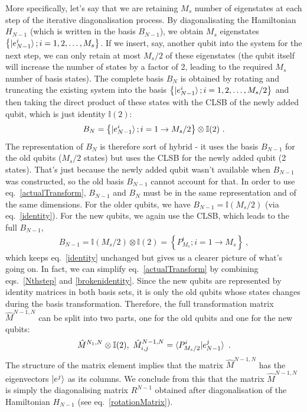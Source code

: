 \documentclass[reprint]{revtex4-2}
\begin{document}
More specifically, let's say that we are retaining \(M_s\) number of eigenstates at each step of the iterative diagonalisation process. By diagonalisating the Hamiltonian \(H_{N-1}\) (which is written in the basis \(B_{N-1}\)), we obtain \(M_s\) eigenstates \( \left\{ \ket{e^i_{N-1}}; i=1,2,\ldots,M_s\right\} \). If we insert, say, another qubit into the system for the next step, we can only retain at most \(M_s/2\) of these eigenstates (the qubit itself will increase the number of states by a factor of 2, leading to the required \(M_s\) number of basis states). The complete basis \(B_{N}\) is obtained by rotating and truncating the existing system into the basis \(\left\{\ket{e^i_{N-1}}; i=1,2,\ldots,M_s/2\right\}\) and then taking the direct product of these states with the CLSB of the newly added qubit, which is just identity \(\mathbb{I}(2)\):
\begin{equation}\begin{aligned}\label{Nthstep}
	B_{N} = \left\{\ket{e^i_{N-1}}; i=1 \to M_s/2\right\}  \otimes \mathbb{I}(2)~.
\end{aligned}\end{equation}
The representation of \(B_N\) is therefore sort of hybrid - it uses the basis \(B_{N-1}\) for the old qubits (\(M_s/2\) states)	but uses the CLSB for the newly added qubit (2 states). That's just because the newly added qubit wasn't available when \(B_{N-1}\) was constructed, so the old basis \(B_{N-1}\) cannot account for that. In order to use eq.~\ref{actualTransform}, \(B_{N-1}\) and \(B_N\) must be in the same representation and of the same dimensions.  For the older qubits, we have \(B_{N-1} = \mathbb I(M_s/2)\) (via eq.~\ref{identity}). For the new qubits, we again use the CLSB, which leads to the full \(B_{N-1}\),
\begin{equation}\begin{aligned}\label{brokenidentity}
	B_{N-1} = \mathbb I(M_s/2) \otimes \mathbb I(2) = \left\{ P^i_{M_s}; i=1\to M_s \right\} ~,
\end{aligned}\end{equation}
which keeps eq.~\ref{identity} unchanged but gives us a clearer picture of what's going on. In fact, we can simplify eq.~\ref{actualTransform} by combining eqs.~\ref{Nthstep} and \ref{brokenidentity}. Since the new qubits are represented by identity matrices in both basis sets, it is only the old qubits whose states changes during the basis transformation. Therefore, the full transformation matrix \(\hat M^{N-1, N}\) can be split into two parts, one for the old qubits and one for the new qubits:
\begin{equation}\begin{aligned}
	\hat M^{N_1, N} \otimes \mathbb{I}(2),~\hat M^{N-1, N}_{i, j} = \braket{P^i_{M_s/2} | e^j_{N-1}}~.
\end{aligned}\end{equation}
The structure of the matrix element implies that the matrix \(\hat M^{N-1, N}\) has the eigenvectors \(\ket{e^j}\) as its columns. We conclude from this that the matrix \(\hat M^{N-1, N}\) is simply the diagonalising matrix \(R^{N-1}\) obtained after diagonalisation of the Hamiltonian \(H_{N-1}\) (see eq.~\ref{rotationMatrix}).
\end{document}
